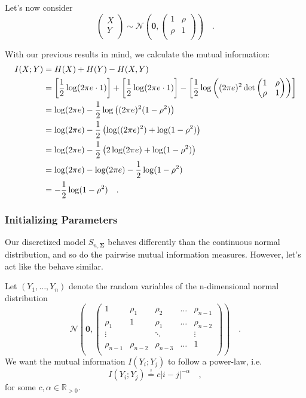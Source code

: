 \documentclass[../../main.tex]{subfiles}
\begin{document}
Let's now consider
\[
    \begin{pmatrix*}
        X \\
        Y \\
    \end{pmatrix*}
    \sim \mathcal{N}\left(\bm{0}, \begin{pmatrix*}
        1 & \rho \\
        \rho & 1 \\
    \end{pmatrix*}\right)
    \quad .
\]

With our previous results in mind, we calculate the mutual information:
\begin{align}
    I(X; Y) &= H(X) + H(Y) - H(X, Y) \notag \\
    &= \left[ \frac{1}{2} \log(2\pi e \cdot 1) \right] + \left[ \frac{1}{2} \log(2\pi e \cdot 1) \right] - \left[ \frac{1}{2} \log\left( (2\pi e)^2 \det\begin{pmatrix*} 1 & \rho \\ \rho & 1 \end{pmatrix*} \right) \right] \notag \\
    &= \log(2\pi e) - \frac{1}{2} \log\left( (2\pi e)^2 (1-\rho^2) \right) \notag \\
    &= \log(2\pi e) - \frac{1}{2} \left( \log((2\pi e)^2) + \log(1-\rho^2) \right) \notag \\
    &= \log(2\pi e) - \frac{1}{2} \left( 2\log(2\pi e) + \log(1-\rho^2) \right) \notag \\
    &= \log(2\pi e) - \log(2\pi e) - \frac{1}{2}\log(1-\rho^2) \notag \\
    &= -\frac{1}{2}\log(1-\rho^2) \label{eq:gauss_mutual_information} \quad .
\end{align}

\subsubsection{Initializing Parameters}
Our discretized model $S_{n, \bm{\Sigma}}$ behaves differently than the continuous normal distribution, and so do the pairwise mutual information measures. However, let's act like the behave similar.

Let $(Y_1, \dots, Y_n)$ denote the random variables of the n-dimensional normal distribution
\[
    \mathcal{N}\left(\bm{0}, \begin{pmatrix*}
        1& \rho_1& \rho_2& \dots & \rho_{n-1} \\
        \rho_1& 1& \rho_1& \dots & \rho_{n-2} \\
        \vdots &  & \ddots & & \vdots \\
        \rho_{n-1} & \rho_{n-2} & \rho_{n-3} & \dots & 1 \\
    \end{pmatrix*}\right) \quad .
\]
We want the mutual information $I(Y_i; Y_j)$ to follow a power-law, i.e.
\[
    I(Y_i; Y_j) \overset{!}{=} c |i-j|^{-\alpha} \quad ,
\]
for some $c, \alpha \in \mathbb{R}_{>0}$.
\end{document}
